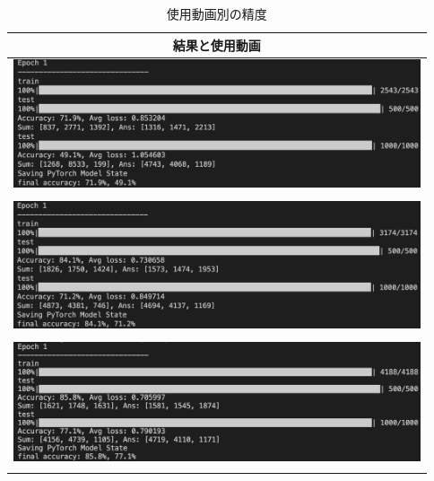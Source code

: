\begin{table}[b]
  \begin{center}
    \begin{tabular}{|c|} \hline
      結果と使用動画 \\ \hline
      \includegraphics[width=120mm]{images/net_result/result10.png}
      \\
      \cite{ballet}\cite{thai}\cite{jpn2}
      \cite{kadokawa}\cite{bts}\cite{manolo}
      \cite{posing}\cite{boxing}\cite{shinkokyu}\cite{leaves}
      \\ \hline
      \includegraphics[width=120mm]{images/net_result/result13.png}
      \\
      \cite{jpn}\cite{ballet}\cite{thai}\cite{jpn2}
      \cite{ariana}\cite{kadokawa}\cite{bts}\cite{manolo}
      \cite{posing}\cite{boxing}\cite{running}\cite{shinkokyu}\cite{leaves}
      \\ \hline
      \includegraphics[width=120mm]{images/net_result/result16.png}
      \\
      \cite{jpn}\cite{china}\cite{ballet}\cite{thai}\cite{jpn2}
      \cite{ariana}\cite{kadokawa}\cite{bts}\cite{manolo}\cite{aito}
      \cite{radio}\cite{posing}\cite{boxing}\cite{running}\cite{shinkokyu}\cite{leaves}
      \\ \hline
    \end{tabular}
  \end{center}
  \caption{使用動画別の精度}
  \label{result}
\end{table}
\clearpage

